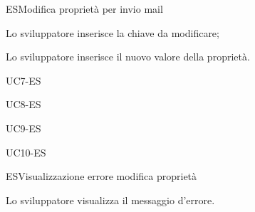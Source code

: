 \begin{usecase}{6}{ES}{Modifica proprietà per invio mail}
	
	
	
	\begin{ucscenarioprincipale}
		\item Lo sviluppatore inserisce la chiave da modificare;
		\item Lo sviluppatore inserisce il nuovo valore della proprietà.
	\end{ucscenarioprincipale}
	
	
	\begin{ucestensioni}
		\item UC7-ES
	\end{ucestensioni}
	
	\begin{ucgeneralizzazioni}
		\item UC8-ES
		\item UC9-ES
		\item UC10-ES
	\end{ucgeneralizzazioni}
	
	\label{uc:modifica-proprieta-es}
\end{usecase}

\begin{usecase}{7}{ES}{Visualizzazione errore modifica proprietà}



	\begin{ucscenarioprincipale}
		\item Lo sviluppatore visualizza il messaggio d'errore.
	\end{ucscenarioprincipale}

	
	\label{uc:vis-errore--mod-proprieta-es}
\end{usecase}

